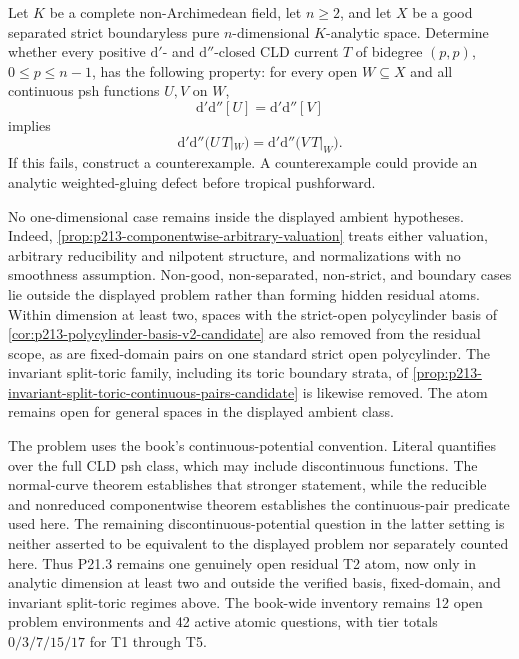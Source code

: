 \begin{problem}
\label{prob:frontier-cross-fan-upstairs}
Let \(K\) be a complete non-Archimedean field, let \(n\geq2\), and let \(X\)
be a good separated strict boundaryless pure \(n\)-dimensional
\(K\)-analytic space.  Determine whether every positive
\(\mathrm d'\)- and \(\mathrm d''\)-closed CLD current \(T\) of bidegree
\((p,p)\), \(0\leq p\leq n-1\), has the following property: for every open
\(W\subseteq X\) and all continuous psh functions \(U,V\) on \(W\),
\begin{equation}
                  \mathrm d'\mathrm d''[U]
                  =\mathrm d'\mathrm d''[V]
 \label{eq:p21p3-post-nonreduced-residual-equal-curvature}
\end{equation}
implies
\begin{equation}
 \mathrm d'\mathrm d''\bigl(U\,T|_W\bigr)
 =\mathrm d'\mathrm d''\bigl(V\,T|_W\bigr).
 \label{eq:p21p3-post-nonreduced-residual-bt}
\end{equation}
If this fails, construct a counterexample.  A counterexample could provide an
analytic weighted-gluing defect before tropical pushforward.
\end{problem}

No one-dimensional case remains inside the displayed ambient hypotheses.
Indeed, \cref{prop:p213-componentwise-arbitrary-valuation} treats either
valuation, arbitrary reducibility and nilpotent structure, and normalizations
with no smoothness assumption.  Non-good, non-separated, non-strict, and
boundary cases lie outside the displayed problem rather than forming hidden
residual atoms.  Within dimension at least two, spaces with the strict-open
polycylinder basis of
\cref{cor:p213-polycylinder-basis-v2-candidate} are also removed from the
residual scope, as are fixed-domain pairs on one standard strict open
polycylinder.  The invariant split-toric family, including its toric boundary
strata, of
\cref{prop:p213-invariant-split-toric-continuous-pairs-candidate} is likewise
removed.  The atom remains open for general spaces in the displayed ambient
class.


The problem uses the book's continuous-potential convention.  Literal
\cite[Definition~8.6.2]{CLD25} quantifies over the full CLD psh class, which
may include discontinuous functions.  The normal-curve theorem establishes
that stronger statement, while the reducible and nonreduced componentwise
theorem establishes the continuous-pair predicate used here.  The remaining
discontinuous-potential question in the latter setting is neither asserted to
be equivalent to the displayed problem nor separately counted here.  Thus
P21.3 remains one genuinely open residual T2 atom, now only in analytic
dimension at least two and outside the verified basis, fixed-domain, and
invariant split-toric regimes above.  The book-wide inventory remains
12 open problem environments and 42 active atomic questions, with
tier totals \(0/3/7/15/17\) for T1 through T5.

